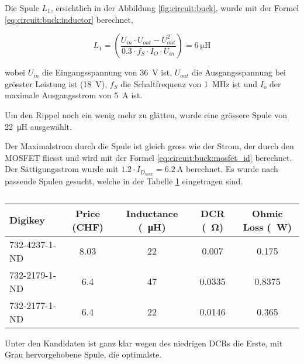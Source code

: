 Die Spule $L_1$, ersichtlich in der Abbildung \ref{fig:circuit:buck}, wurde  mit
der Formel \ref{eq:circuit:buck:inductor} berechnet,

\begin{equation}
    L_1 = \left( \frac{U_{in} \cdot U_{out} - U_{out}^2}{0.3 \cdot f_S \cdot I_O \cdot U_{in}} \right) = \SI{6}{\micro\henry}
    \label{eq:circuit:buck:inductor}
\end{equation}

wobei  $U_{in}$  die  Eingangsspannung von  \SI{36}{\volt}  ist,  $U_{out}$  die
Ausgangsspannung  bei  gr\"osster   Leistung  ist  (\SI{18}{\volt}),  $f_S$  die
Schaltfrequenz von  \SI{1}{\mega\hertz} ist und $I_o$ der maximale Ausgangsstrom
von \SI{5}{\ampere} ist.

Um den Rippel  noch ein wenig mehr zu gl\"atten, wurde eine gr\"ossere Spule von
\SI{22}{\micro\henry} ausgew\"ahlt.

Der Maximalstrom durch die Spule ist gleich gross wie  der  Strom, der durch den
MOSFET   fliesst   und   wird  mit  der  Formel  \ref{eq:circuit:buck:mosfet_id}
berechnet.  Der  S\"attigungsstrom   wurde   mit   $1.2   \cdot   I_{D_{max}}  =
\SI{6.2}{\ampere}$ berechnet. Es  wurde  nach passende Spulen gesucht, welche in
der Tabelle \ref{tab:circuit:buck:inductor} eingetragen sind.

\begin{table}[th!]
    \begin{center}
        \caption{}
        \label{tab:circuit:buck:inductor}
        \begin{tabular}{lcccc}
            \toprule
            Digikey         & Price (CHF) & Inductance (\SI{}{\micro\henry}) & DCR (\SI{}{\ohm}) & Ohmic Loss (\SI{}{\watt}) \\
            \midrule
            \rowcolor{lightgray}
            732-4237-1-ND   & 8.03        & 22                               & 0.007             & 0.175  \\
            732-2179-1-ND   & 6.4         & 47                               & 0.0335            & 0.8375 \\
            732-2177-1-ND   & 6.4         & 22                               & 0.0146            & 0.365  \\
            \bottomrule
        \end{tabular}
    \end{center}
\end{table}

Unter den Kandidaten ist ganz klar wegen des niedrigen DCRs die Erste,  mit Grau
hervorgehobene Spule, die optimalste.
